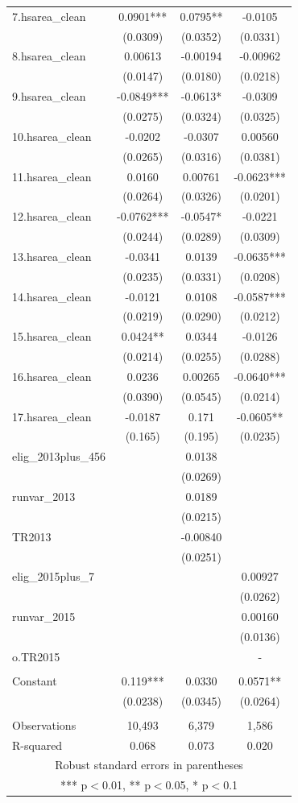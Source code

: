 \documentclass[]{article}
\begin{document}
\begin{tabular}{lccc}
7.hsarea\_clean & 0.0901*** & 0.0795** & -0.0105 \\
 & (0.0309) & (0.0352) & (0.0331) \\
8.hsarea\_clean & 0.00613 & -0.00194 & -0.00962 \\
 & (0.0147) & (0.0180) & (0.0218) \\
9.hsarea\_clean & -0.0849*** & -0.0613* & -0.0309 \\
 & (0.0275) & (0.0324) & (0.0325) \\
10.hsarea\_clean & -0.0202 & -0.0307 & 0.00560 \\
 & (0.0265) & (0.0316) & (0.0381) \\
11.hsarea\_clean & 0.0160 & 0.00761 & -0.0623*** \\
 & (0.0264) & (0.0326) & (0.0201) \\
12.hsarea\_clean & -0.0762*** & -0.0547* & -0.0221 \\
 & (0.0244) & (0.0289) & (0.0309) \\
13.hsarea\_clean & -0.0341 & 0.0139 & -0.0635*** \\
 & (0.0235) & (0.0331) & (0.0208) \\
14.hsarea\_clean & -0.0121 & 0.0108 & -0.0587*** \\
 & (0.0219) & (0.0290) & (0.0212) \\
15.hsarea\_clean & 0.0424** & 0.0344 & -0.0126 \\
 & (0.0214) & (0.0255) & (0.0288) \\
16.hsarea\_clean & 0.0236 & 0.00265 & -0.0640*** \\
 & (0.0390) & (0.0545) & (0.0214) \\
17.hsarea\_clean & -0.0187 & 0.171 & -0.0605** \\
 & (0.165) & (0.195) & (0.0235) \\
elig\_2013plus\_456 &  & 0.0138 &  \\
 &  & (0.0269) &  \\
runvar\_2013 &  & 0.0189 &  \\
 &  & (0.0215) &  \\
TR2013 &  & -0.00840 &  \\
 &  & (0.0251) &  \\
elig\_2015plus\_7 &  &  & 0.00927 \\
 &  &  & (0.0262) \\
runvar\_2015 &  &  & 0.00160 \\
 &  &  & (0.0136) \\
o.TR2015 &  &  & - \\
 &  &  &  \\
Constant & 0.119*** & 0.0330 & 0.0571** \\
 & (0.0238) & (0.0345) & (0.0264) \\
 &  &  &  \\
Observations & 10,493 & 6,379 & 1,586 \\
 R-squared & 0.068 & 0.073 & 0.020 \\ \hline
\multicolumn{4}{c}{ Robust standard errors in parentheses} \\
\multicolumn{4}{c}{ *** p$<$0.01, ** p$<$0.05, * p$<$0.1} \\
\end{tabular}
\end{document}
